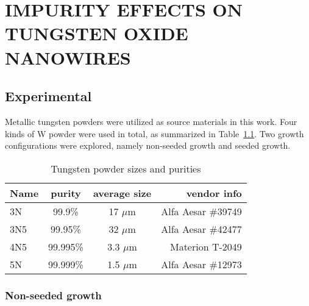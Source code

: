 
\chapter{IMPURITY EFFECTS ON TUNGSTEN OXIDE NANOWIRES}



\section{Experimental}
Metallic tungsten powders were utilized as source materials in this work. Four kinds of W powder were used in total, as summarized in Table~\ref{tab:powder}. Two growth configurations were explored, namely non-seeded growth and seeded growth.
\begin{table}[htb]
\centering
\caption{Tungsten powder sizes and purities}\label{tab:powder}
\begin{tabular}{lccr}
\toprule
Name & purity & average size & vendor info\\
\midrule
3N   &  99.9\% & 17 $\mu$m & Alfa Aesar \#39749\\
3N5   &  99.95\% & 32 $\mu$m  & Alfa Aesar \#42477\\
4N5   &  99.995\% & 3.3 $\mu$m  & Materion T-2049 \\
5N   &  99.999\% & 1.5 $\mu$m & Alfa Aesar \#12973\\
\bottomrule
\end{tabular}
\end{table}

\subsection{Non-seeded growth}

